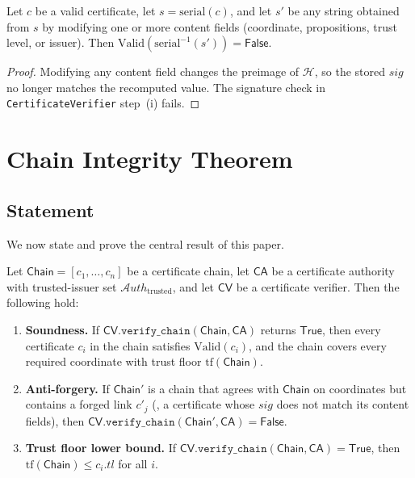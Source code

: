 \documentclass[11pt]{article}
\newcommand{\Chain}{\mathsf{Chain}}            %
\newcommand{\CA}{\mathsf{CA}}                  %
\newcommand{\CV}{\mathsf{CV}}                  %
\newcommand{\certtrust}{\mathit{tl}}           %
\newcommand{\certsig}{\mathit{sig}}            %
\newcommand{\Valid}{\mathrm{Valid}}            %
\newcommand{\Sigalg}{\mathcal{H}}              %
\newcommand{\AuthSet}{\mathcal{A}\!\mathit{uth}} %
\newcommand{\serial}{\mathrm{serial}}          %
\begin{document}
\begin{proposition}\label{prop:tamper}
Let $c$ be a valid certificate, let $s = \serial(c)$, and let $s'$ be
any string obtained from $s$ by modifying one or more content fields
(coordinate, propositions, trust level, or issuer).
Then $\Valid(\serial^{-1}(s')) = \mathsf{False}$.
\end{proposition}
\begin{proof}
Modifying any content field changes the preimage of $\Sigalg$, so the
stored $\certsig$ no longer matches the recomputed value.
The signature check in \texttt{CertificateVerifier} step~(i) fails.
\end{proof}

\section{Chain Integrity Theorem}\label{sec:theorem}

\subsection{Statement}

We now state and prove the central result of this paper.

\begin{theorem}\label{thm:chain-integrity}
Let $\Chain = [c_1, \ldots, c_n]$ be a certificate chain,
let $\CA$ be a certificate authority with trusted-issuer set $\AuthSet_{\mathrm{trusted}}$,
and let $\CV$ be a certificate verifier.
Then the following hold:

\begin{enumerate}[label=(\alph*)]
  \item \textbf{Soundness.}
        If $\CV.\texttt{verify\_chain}(\Chain, \CA)$ returns $\mathsf{True}$,
        then every certificate $c_i$ in the chain satisfies
        $\Valid(c_i)$, and the chain covers every required coordinate
        with trust floor $\mathrm{tf}(\Chain)$.

  \item \textbf{Anti-forgery.}
        If $\Chain'$ is a chain that agrees with $\Chain$ on coordinates
        but contains a forged link $c'_j$ (\ie, a certificate whose
        $\certsig$ does not match its content fields), then
        $\CV.\texttt{verify\_chain}(\Chain', \CA) = \mathsf{False}$.

  \item \textbf{Trust floor lower bound.}
        If $\CV.\texttt{verify\_chain}(\Chain, \CA) = \mathsf{True}$, then
        $\mathrm{tf}(\Chain) \le c_i.\certtrust$ for all $i$.
\end{enumerate}
\end{theorem}
\end{document}
